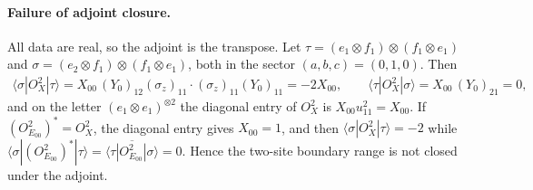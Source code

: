 \documentclass{article}
\begin{document}
\paragraph{Failure of adjoint closure.} All data are real, so the adjoint
is the transpose. Let $\tau=(e_1\otimes f_1)\otimes(f_1\otimes e_1)$ and
$\sigma=(e_2\otimes f_1)\otimes(f_1\otimes e_1)$, both in the sector
$(a,b,c)=(0,1,0)$. Then
\begin{align}
    \langle\sigma|O^2_X|\tau\rangle
    =X_{00}\,(Y_0)_{12}(\sigma_z)_{11}\cdot(\sigma_z)_{11}(Y_0)_{11}
    =-2X_{00},\qquad
    \langle\tau|O^2_X|\sigma\rangle=X_{00}\,(Y_0)_{21}=0,
    \label{eq:glm23_parent_commutation_closure_failure_entries}
\end{align}
and on the letter $(e_1\otimes e_1)^{\otimes2}$ the diagonal entry of
$O^2_X$ is $X_{00}u_{11}^2=X_{00}$. If $(O^2_{E_{00}})^*=O^2_X$, the
diagonal entry gives $X_{00}=1$, and then
$\langle\sigma|O^2_X|\tau\rangle=-2$ while
$\langle\sigma|(O^2_{E_{00}})^*|\tau\rangle
    =\overline{\langle\tau|O^2_{E_{00}}|\sigma\rangle}=0$. Hence the two-site
boundary range is not closed under the adjoint.
\end{document}
